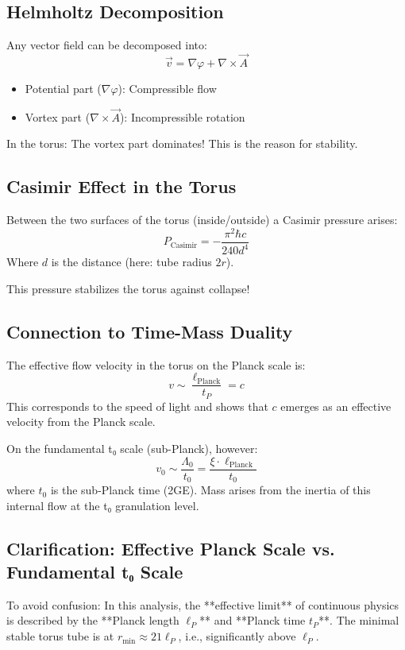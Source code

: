 \subsection{Helmholtz Decomposition}
Any vector field can be decomposed into:
\[
\vec{v} = \nabla \varphi + \nabla \times \vec{A}
\]
\begin{itemize}
	\item Potential part (\( \nabla \varphi \)): Compressible flow
	\item Vortex part (\( \nabla \times \vec{A} \)): Incompressible rotation
\end{itemize}

In the torus: The vortex part dominates! This is the reason for stability.

\subsection{Casimir Effect in the Torus}
Between the two surfaces of the torus (inside/outside) a Casimir pressure arises:
\[
P_{\text{Casimir}} = -\frac{\pi^2 \hbar c}{240 d^4}
\]
Where \( d \) is the distance (here: tube radius \( 2r \)).

This pressure stabilizes the torus against collapse!

\subsection{Connection to Time-Mass Duality}
The effective flow velocity in the torus on the Planck scale is:
\[
v \sim \frac{\ell_{\text{Planck}}}{t_P} = c
\]
This corresponds to the speed of light and shows that \( c \) emerges as an effective velocity from the Planck scale.

On the fundamental t₀ scale (sub-Planck), however:
\[
v_0 \sim \frac{\Lambda_0}{t_0} = \frac{\xi \cdot \ell_{\text{Planck}}}{t_0}
\]
where \( t_0 \) is the sub-Planck time (2GE). Mass arises from the inertia of this internal flow at the t₀ granulation level.

\subsection{Clarification: Effective Planck Scale vs. Fundamental t₀ Scale}
To avoid confusion: In this analysis, the **effective limit** of continuous physics is described by the **Planck length \( \ell_P \)** and **Planck time \( t_P \)**. The minimal stable torus tube is at \( r_{\min} \approx 21 \ell_P \), i.e., significantly above \( \ell_P \).

